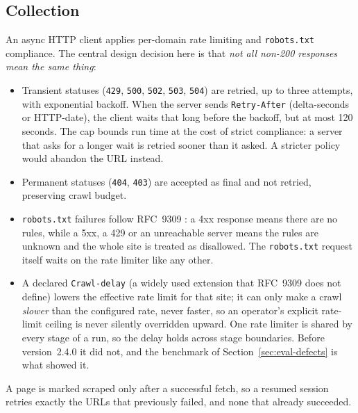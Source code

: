 \documentclass[11pt]{article}
\begin{document}
\subsection{Collection}
\label{sec:collection}
An async HTTP client applies per-domain rate limiting and
\texttt{robots.txt} compliance. The central design decision here is
that \emph{not all non-200 responses mean the same thing}:

\begin{itemize}[leftmargin=1.5em]
  \item Transient statuses (\texttt{429}, \texttt{500}, \texttt{502},
    \texttt{503}, \texttt{504}) are retried, up to three attempts, with
    exponential backoff. When the server sends \texttt{Retry-After}
    (delta-seconds or HTTP-date), the client waits that long before the
    backoff, but at most 120 seconds. The cap bounds run time at the cost
    of strict compliance: a server that asks for a longer wait is retried
    sooner than it asked. A stricter policy would abandon the URL instead.
  \item Permanent statuses (\texttt{404}, \texttt{403}) are accepted as
    final and not retried, preserving crawl budget.
  \item \texttt{robots.txt} failures follow RFC~9309 \cite{rfc9309}: a
    4xx response means there are no rules, while a 5xx, a 429 or an
    unreachable server means the rules are unknown and the whole site is
    treated as disallowed. The \texttt{robots.txt} request itself waits on
    the rate limiter like any other.
  \item A declared \texttt{Crawl-delay} (a widely used extension that
    RFC~9309 does not define) lowers the effective rate limit for that
    site; it can only make a crawl \emph{slower} than the configured rate,
    never faster, so an operator's explicit rate-limit ceiling is never
    silently overridden upward. One rate limiter is shared by every stage
    of a run, so the delay holds across stage boundaries. Before
    version~2.4.0 it did not, and the benchmark of
    Section~\ref{sec:eval-defects} is what showed it.
\end{itemize}

A page is marked scraped only after a successful fetch, so a resumed
session retries exactly the URLs that previously failed, and none that
already succeeded.
\end{document}
